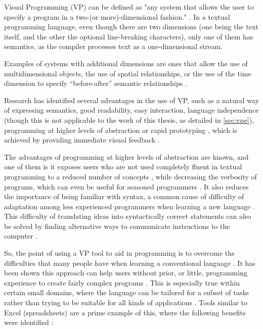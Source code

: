 Visual Programming (VP) can be defined as "any system that allows the user to specify a program in a
two-(or more)-dimensional fashion." \cite{Myers1986}.
In a textual programming language, even though there are two dimensions (one
being the text itself, and the other the optional line-breaking characters),
only one of them has semantics, as the compiler processes text as a
one-dimensional stream.

Examples of systems with additional dimensions are ones that allow the use of
multidimensional objects, the use of spatial relationships, or the use of the
time dimension to specify “before-after” semantic relationships \cite{Burnett1999}.

Research has identified several advantages in the use of VP, such as a natural
way of expressing semantics, good readability, easy interaction, language independence (though
this is not applicable to the work of this thesis, as detailed in \ref{sec:vpe}),
programming at higher levels of abstraction or rapid prototyping \cite{JamalRahmanandWenzel2014},
which is achieved by providing immediate visual feedback \cite{Shu1988}.

The advantages of programming at higher levels of abstraction are known, and
one of them is it exposes users who are not used completely fluent in textual programming
to a reduced number of concepts \cite{Shu1988}, while decreasing the verbosity of
programs, which can even be useful for seasoned programmers \cite{Myers1990}.
It also reduces the importance of being familiar with syntax, a common cause
of difficulty of adaptation among less experienced programmers when learning
a new language \cite{cunniff1986does}\cite{Carlisle2005}. This difficulty of translating ideas
into syntactically correct statements can also be solved by finding alternative
ways to communicate instructions to the computer \cite{Kelleher2005}.

So, the point of using a VP tool to aid in programming is to overcome the
difficulties that many people have when learning a conventional language
\cite{Lewis1987}. It has been shown this approach can help users without prior, or little,
programming experience to create fairly complex programs \cite{Halbert1984}.
This is especially true within certain small domains, where the language can be
tailored for a subset of tasks rather than trying to be suitable for all kinds
of applications \cite{Kelleher2005}. Tools similar to Excel (spreadsheets) are a prime example of this, where the following
benefits were identified \cite{ambler1987forms}\cite{Lewis1987}:

